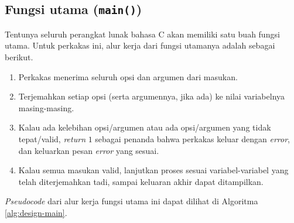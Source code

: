 \subsection{Fungsi utama (\texttt{main()})}
\label{sec:design-code-main}

Tentunya seluruh perangkat lunak bahasa C akan memiliki satu buah fungsi utama. Untuk perkakas ini, alur kerja dari fungsi utamanya adalah sebagai berikut.

\begin{enumerate}
	\item Perkakas menerima seluruh opsi dan argumen dari masukan.
	\item Terjemahkan setiap opsi (serta argumennya, jika ada) ke nilai variabelnya masing-masing.
	\item Kalau ada kelebihan opsi/argumen atau ada opsi/argumen yang tidak tepat/valid, \textit{return} $1$ sebagai penanda bahwa perkakas keluar dengan \textit{error}, dan keluarkan pesan \textit{error} yang sesuai.
	\item Kalau semua masukan valid, lanjutkan proses sesuai variabel-variabel yang telah diterjemahkan tadi, sampai keluaran akhir dapat ditampilkan.
\end{enumerate}
\noindent
\textit{Pseudocode} dari alur kerja fungsi utama ini dapat dilihat di Algoritma \ref{alg:design-main}.


